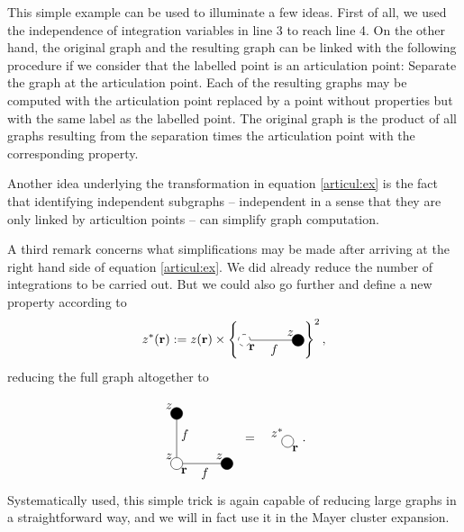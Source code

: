 \documentclass[8.5pt,twoside,twocolumn]{article}
\renewcommand\r{\bo r}
\theoremstyle{standard}
\begin{document}
This simple example can be used to illuminate a few ideas. First of all, we used the
independence of integration variables in line 3 to reach line 4. On the other hand, the original graph
and the resulting graph can be linked with the following procedure if we consider that the
labelled point is an articulation point: Separate the graph at the articulation point. Each
of the resulting graphs may be computed with the articulation point replaced by a point
without properties but with the same label as the labelled point. The original
graph is the product of all graphs resulting from the separation times the articulation
point with the corresponding property.

Another idea underlying the transformation in equation \eqref{articul:ex} is the fact that
identifying independent subgraphs -- independent in a sense that they are only linked by
articultion points -- can simplify graph computation.

A third remark concerns what simplifications may be made after arriving at the right hand side
of equation \eqref{articul:ex}. We did already reduce the number of integrations to be carried
out. But we could also go further and define a new property according to
\begin{equation}
z^*(\r) := z(\r) \times
\brc{\begin{tikzpicture}[baseline={(current bounding box.center)}]%
  	\draw (0,0) node[circle,minimum size=0.2cm,draw,fill=white,dashed] (A) {};
  	\draw (1.5,0) node[circle,minimum size=0.2cm,draw,fill=black] (B) {};
  	\node [above left] at (B) {$z$};
  	\draw (A.east) --  node[below]{$f$}(B.center);
  	\node [below right] at (A) {\r};
\end{tikzpicture}}^2,
\end{equation}
reducing the full graph altogether to

\begin{equation}
\begin{tikzpicture}[baseline={(current bounding box.center)}]%
  	\draw (0,-.7) node[circle,minimum size=0.2cm,draw,fill=white, fill opacity=0] (A) {};
  	\draw (0,.7) node[circle,minimum size=0.2cm,draw,fill=black] (B) {};
  	\draw (1.4,-.7) node[circle,minimum size=0.2cm,draw,fill=black] (C) {};
  	\draw (A.north) --  node[right]{$f$}(B.center);
  	\draw (A.east) --  node[below]{$f$}(C.center);
  	\node [above left] at (A) {$z$};
	\node [above left] at (B) {$z$};
	\node [above left] at (C) {$z$};
  	\node [below right] at (A) {\r};
\end{tikzpicture}
\ \  = \ \ 
\begin{tikzpicture}[baseline=0]%
  	\draw (0,0) node[circle,minimum size=0.2cm,draw,fill=white, fill opacity=0] (A) {};
  	\node [above left] at (A) {$z^*$};
  	\node [below right] at (A) {$\r$};
\end{tikzpicture}.
\label{articul:simple}
\end{equation}
Systematically used, this simple trick is again capable of reducing large graphs in a
straightforward way, and we will in fact use it in the Mayer cluster expansion.
\end{document}
